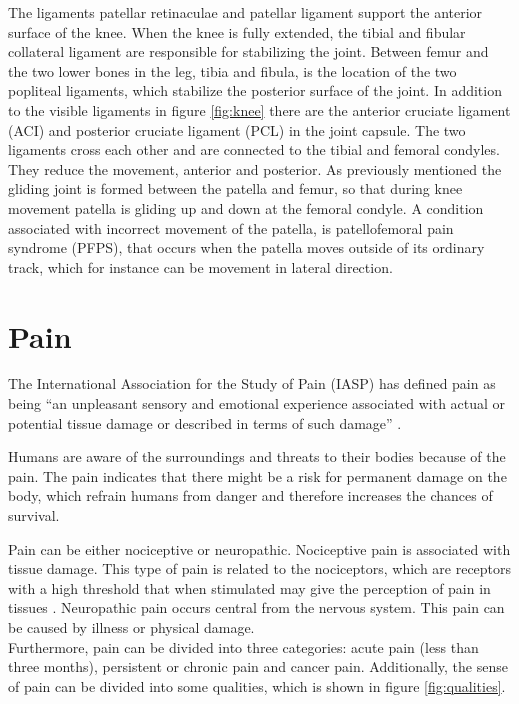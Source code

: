\noindent
The ligaments patellar retinaculae and patellar ligament support the anterior surface of the knee. When the knee is fully extended, the tibial and fibular collateral ligament are responsible for stabilizing the joint. Between femur and the two lower bones in the leg, tibia and fibula, is the location of the two popliteal ligaments, which stabilize the posterior surface of the joint. In addition to the visible ligaments in figure \ref{fig:knee} there are the anterior cruciate ligament (ACI) and posterior cruciate ligament (PCL) in the joint capsule. The two ligaments cross each other and are connected to the tibial and femoral condyles. They reduce the movement, anterior and posterior.\citep{Martini2012}\newline
\noindent
As previously mentioned the gliding joint is formed between the patella and femur, so that during knee movement patella is gliding up and down at the femoral condyle. A condition associated with incorrect movement of the patella, is patellofemoral pain syndrome (PFPS), that occurs when the patella moves outside of its ordinary track, which for instance can be movement in lateral direction.\citep{Martini2012}


\section{Pain}

The International Association for the Study of Pain (IASP) has defined pain as being “an unpleasant sensory and emotional experience associated with actual or potential tissue damage or described in terms of such damage” \citep{IASP2012, Schmidt1989}.

\noindent
Humans are aware of the surroundings and threats to their bodies because of the pain. The pain indicates that there might be a risk for permanent damage on the body, which refrain humans from danger and therefore increases the chances of survival. 


\noindent
Pain can be either nociceptive or neuropathic. Nociceptive pain is associated with tissue damage. This type of pain is related to the nociceptors, which are receptors with a high threshold that when stimulated may give the perception of pain in tissues \citep{Schmidt2013}. Neuropathic pain occurs central from the nervous system. This pain can be caused by illness or physical damage. \\


\noindent
Furthermore, pain can be divided into three categories: acute pain (less than three months), persistent or chronic pain and cancer pain.\citep{Briggs2010} Additionally, the sense of pain can be divided into some qualities, which is shown in figure \ref{fig:qualities}. 

